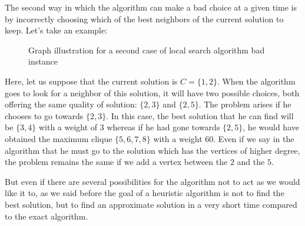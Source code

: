 The second way in which the algorithm can make a bad choice at a given time is by incorrectly 
choosing which of the best neighbors of the current solution to keep. Let's take an example:

\begin{figure}[H]
    \centering
    \caption{Graph illustration for a second case of local search algorithm bad instance}
    \label{fig:local-search-bad-instance-2}
\end{figure}

Here, let us suppose that the current solution is $C = \{1, 2\}$. When the algorithm goes 
to look for a neighbor of this solution, it will have two possible choices, both offering 
the same quality of solution: $\{2, 3\}$ and $\{2, 5\}$. The problem arises if he chooses 
to go towards $\{2, 3\}$. In this case, the best solution that he can find will be $\{3, 4\}$ 
with a weight of $3$ whereas if he had gone towards $\{2, 5\}$, he would have obtained the 
maximum clique $\{5, 6, 7, 8\}$ with a weight $60$. Even if we say in the algorithm that he 
must go to the solution which has the vertices of higher degree, the problem remains the 
same if we add a vertex between the $2$ and the $5$.
\bigskip

But even if there are several possibilities for the algorithm not to act as we would like it 
to, as we said before the goal of a heuristic algorithm is not to find the best solution, but 
to find an approximate solution in a very short time compared to the exact algorithm.